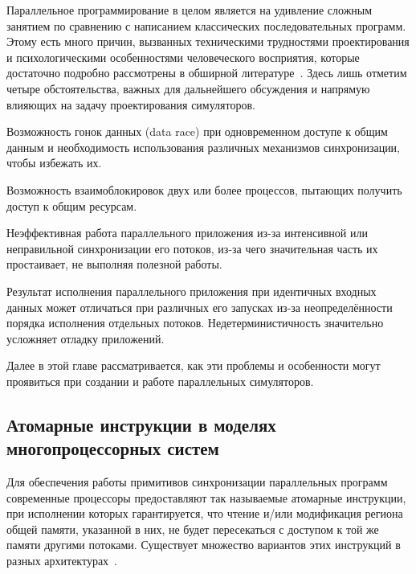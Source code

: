 Параллельное программирование в целом является на удивление сложным занятием по сравнению с написанием классических последовательных программ. Этому есть много причин, вызванных техническими трудностями проектирования и психологическими особенностями человеческого восприятия, которые достаточно подробно рассмотрены в обширной литературе~\cite{Herlihy:2008:AMP:1734069, toporkov2004, Andrews:1999:FPD:519301}. Здесь лишь отметим четыре обстоятельства, важных для дальнейшего обсуждения и напрямую влияющих на задачу проектирования симуляторов.

\begin{enumerate*}
    \item Возможность гонок данных (\abbr data race) при одновременном доступе к общим данным и необходимость использования различных механизмов синхронизации, чтобы избежать их.
    \item Возможность взаимоблокировок двух или более процессов, пытающих получить доступ к общим ресурсам.
    \item Неэффективная работа параллельного приложения из-за интенсивной или неправильной синхронизации его потоков, из-за чего значительная часть их простаивает, не выполняя полезной работы.
    \item Результат исполнения параллельного приложения при идентичных входных данных может отличаться при различных его запусках из-за неопределённости порядка исполнения отдельных потоков. Недетерминистичность значительно усложняет отладку приложений.
\end{enumerate*}

Далее в этой главе рассматривается, как эти проблемы и особенности могут проявиться при создании и работе параллельных симуляторов.

\subsection[Атомарные инструкции]{Атомарные инструкции в моделях многопроцессорных систем}\label{sec:atomics}

Для обеспечения работы примитивов синхронизации параллельных программ современные процессоры предоставляют так называемые атомарные инструкции, при исполнении которых гарантируется, что чтение и/или модификация региона общей памяти, указанной в них, не будет пересекаться с доступом к той же памяти другими потоками. Существует множество вариантов этих инструкций в разных архитектурах~\cite{habr-atomics}. %

